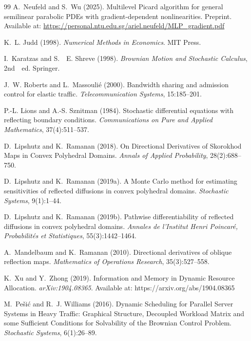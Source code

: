 \documentclass[11pt]{article}
\theoremstyle{definition}
\theoremstyle{plain}
\begin{document}
\begin{appendices}
\begin{thebibliography}{99}
 A.~Neufeld and S.~Wu (2025). \newblock Multilevel Picard algorithm for general semilinear parabolic PDEs with gradient-dependent nonlinearities. \newblock Preprint. Available at: \url{https://personal.ntu.edu.sg/ariel.neufeld/MLP_gradient.pdf}

 K.~L. Judd (1998). \newblock \emph{Numerical Methods in Economics}. \newblock MIT Press.

 I.~Karatzas and S.~~E. Shreve (1998). \newblock \emph{Brownian Motion and Stochastic Calculus}, 2nd~~ed. \newblock Springer.

 J.~W. Roberts and L.~Massouli\'e (2000). \newblock Bandwidth sharing and admission control for elastic traffic. \newblock \emph{Telecommunication Systems}, 15:185--201.

 P.-L. Lions and A.-S. Sznitman (1984). \newblock Stochastic differential equations with reflecting boundary conditions. \newblock \emph{Communications on Pure and Applied Mathematics}, 37(4):511--537.

 D.~Lipshutz and K.~Ramanan (2018). \newblock On Directional Derivatives of Skorokhod Maps in Convex Polyhedral Domains. \newblock \emph{Annals of Applied Probability}, 28(2):688--750.

 D.~Lipshutz and K.~Ramanan (2019a). \newblock A Monte Carlo method for estimating sensitivities of reflected diffusions in convex polyhedral domains. \newblock \emph{Stochastic Systems}, 9(1):1--44.%

 D.~Lipshutz and K.~Ramanan (2019b). \newblock Pathwise differentiability of reflected diffusions in convex polyhedral domains. \newblock \emph{Annales de l'Institut Henri Poincar\'e, Probabilit\'es et Statistiques}, 55(3):1442--1464.%

 A.~Mandelbaum and K.~Ramanan (2010). \newblock Directional derivatives of oblique reflection maps. \newblock \emph{Mathematics of Operations Research}, 35(3):527--558.

 K.~Xu and Y.~Zhong (2019). \newblock Information and Memory in Dynamic Resource Allocation. \newblock \emph{arXiv:1904.08365}. Available at: https://arxiv.org/abs/1904.08365

 M.~Pe\v{s}i\'c and R.~J. Williams (2016). \newblock Dynamic Scheduling for Parallel Server Systems in Heavy Traffic: Graphical Structure, Decoupled Workload Matrix and some Sufficient Conditions for Solvability of the Brownian Control Problem. \newblock \emph{Stochastic Systems}, 6(1):26--89. %


\end{thebibliography}
\end{appendices}
\end{document}
